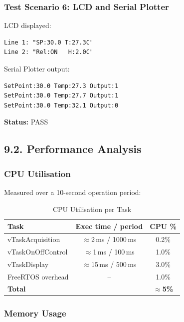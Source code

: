 \documentclass[12pt]{article}
\begin{document}
\subsubsection*{Test Scenario 6: LCD and Serial Plotter}

LCD displayed:
\begin{verbatim}
Line 1: "SP:30.0 T:27.3C"
Line 2: "Rel:ON   H:2.0C"
\end{verbatim}

Serial Plotter output:
\begin{verbatim}
SetPoint:30.0 Temp:27.3 Output:1
SetPoint:30.0 Temp:27.7 Output:1
SetPoint:30.0 Temp:32.1 Output:0
\end{verbatim}
\textbf{Status:} PASS

\subsection*{9.2. Performance Analysis}

\subsubsection*{CPU Utilisation}

Measured over a 10-second operation period:

\begin{table}[H]
    \centering
    \caption{CPU Utilisation per Task}
    \label{tab:cpu}
    \begin{tabular}{|l|c|c|}
        \hline
        \textbf{Task} & \textbf{Exec time / period} & \textbf{CPU \%} \\
        \hline
        vTaskAcquisition  & $\approx$2\,ms / 1000\,ms & 0.2\% \\
        \hline
        vTaskOnOffControl & $\approx$1\,ms / 100\,ms  & 1.0\% \\
        \hline
        vTaskDisplay      & $\approx$15\,ms / 500\,ms & 3.0\% \\
        \hline
        FreeRTOS overhead & --                        & 1.0\% \\
        \hline
        \textbf{Total}    &                           & \textbf{$\approx$5\%} \\
        \hline
    \end{tabular}
\end{table}

\subsubsection*{Memory Usage}
\end{document}

